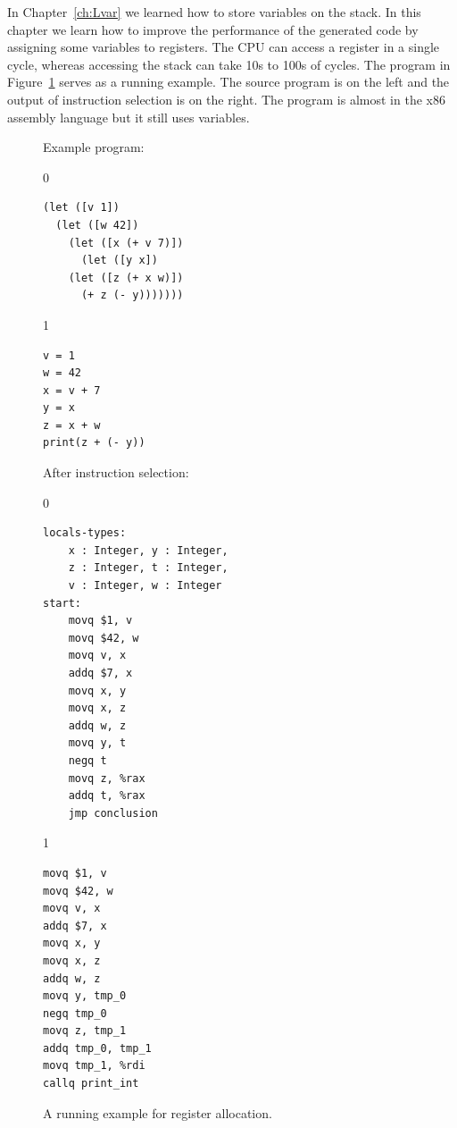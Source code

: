 \documentclass[7x10,nocrop]{TimesAPriori_MIT}%
\def\racketEd{0}
\def\pythonEd{1}
\def\edition{1}
\begin{document}

In Chapter~\ref{ch:Lvar} we learned how to store variables on the
stack. In this chapter we learn how to improve the performance of the
generated code by assigning some variables to registers.  The CPU can
access a register in a single cycle, whereas accessing the stack can
take 10s to 100s of cycles.  The program in Figure~\ref{fig:reg-eg}
serves as a running example. The source program is on the left and the
output of instruction selection is on the right. The program is almost
in the x86 assembly language but it still uses variables.

\begin{figure}
\begin{minipage}{0.45\textwidth}
Example \LangVar{} program:
{\if\edition\racketEd
\begin{lstlisting}
(let ([v 1])
  (let ([w 42])
    (let ([x (+ v 7)])
      (let ([y x])
	(let ([z (+ x w)])
	  (+ z (- y)))))))
\end{lstlisting}
\fi}
{\if\edition\pythonEd
\begin{lstlisting}
v = 1
w = 42
x = v + 7
y = x
z = x + w
print(z + (- y))
\end{lstlisting}
\fi}
\end{minipage}
\begin{minipage}{0.45\textwidth}
After instruction selection:
{\if\edition\racketEd
\begin{lstlisting}
locals-types:
    x : Integer, y : Integer,
    z : Integer, t : Integer,
    v : Integer, w : Integer
start:
    movq $1, v
    movq $42, w
    movq v, x
    addq $7, x
    movq x, y
    movq x, z
    addq w, z
    movq y, t
    negq t
    movq z, %rax
    addq t, %rax
    jmp conclusion
\end{lstlisting}
\fi}
{\if\edition\pythonEd
\begin{lstlisting}
movq $1, v
movq $42, w
movq v, x
addq $7, x
movq x, y
movq x, z
addq w, z
movq y, tmp_0
negq tmp_0
movq z, tmp_1
addq tmp_0, tmp_1
movq tmp_1, %rdi
callq print_int
\end{lstlisting}
\fi}
\end{minipage}
\caption{A running example for register allocation.}
\label{fig:reg-eg}
\end{figure}
\end{document}
